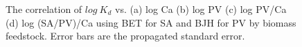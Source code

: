 \begin{figure}[!ht]
\hfill
{}
\hfill
{}
\hfill
{}
\caption{The correlation of $log~K_d$ vs. (a) log Ca (b) log PV (c) log PV/Ca (d) log (SA/PV)/Ca using BET for SA and BJH for PV by biomass feedstock. Error bars are the propagated standard error.}
\label{fig:Kd_SAPV_Ca}
\end{figure}

